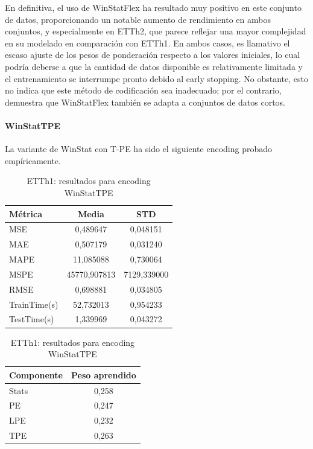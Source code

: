 En definitiva, el uso de WinStatFlex ha resultado muy positivo en este conjunto de datos, proporcionando un notable aumento de rendimiento en ambos conjuntos, y especialmente en ETTh2, que parece reflejar una mayor complejidad en su modelado en comparación con ETTh1. En ambos casos, es llamativo el escaso ajuste de los pesos de ponderación respecto a los valores iniciales, lo cual podría deberse a que la cantidad de datos disponible es relativamente limitada y el entrenamiento se interrumpe pronto debido al early stopping. No obstante, esto no indica que este método de codificación sea inadecuado; por el contrario, demuestra que WinStatFlex también se adapta a conjuntos de datos cortos.
 
 \paragraph{WinStatTPE}
 
 La variante de WinStat con T-PE ha sido el siguiente encoding probado empíricamente. 
 \begin{table}[!ht]
 	\centering
 	\begin{minipage}{0.5\textwidth}
 		\centering
 		\begin{tabular}{l|c|c}
 			\toprule
 			Métrica & Media & STD \\
 			\midrule
 			MSE & 0,489647 & 0,048151 \\
	 		MAE & 0,507179 & 0,031240 \\
	 		MAPE & 11,085088 & 0,730064 \\
	 		MSPE & 45770,907813 & 7129,339000 \\
	 		RMSE & 0,698881 & 0,034805 \\
	 		TrainTime(s) & 52,732013 & 0,954233 \\
	 	 	TestTime(s) & 1,339969 & 0,043272 \\
 			\bottomrule
 		\end{tabular}
 	\end{minipage}%
 	\hfill
 	\begin{minipage}{0.4\textwidth}
 		\centering
 		\begin{tabular}{l|c}
 			\toprule
 			Componente & Peso aprendido \\
 			\midrule
 			Stats & 0,258 \\
 			PE & 0,247 \\
 			LPE & 0,232 \\
 			TPE & 0,263 \\
 			\bottomrule
 		\end{tabular}
 	\end{minipage}
 	
 	\caption{ETTh1: resultados para encoding WinStatTPE}
 	\label{etth1tpe}
 \end{table}
 
